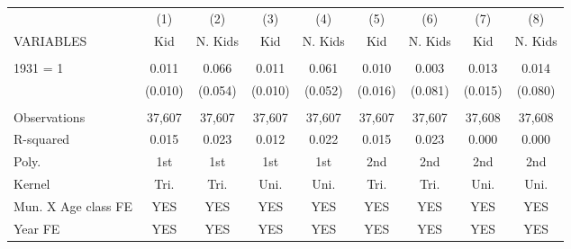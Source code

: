 \begin{tabular}{lcccccccc} \hline
 & (1) & (2) & (3) & (4) & (5) & (6) & (7) & (8) \\
VARIABLES & Kid & N. Kids & Kid & N. Kids & Kid & N. Kids & Kid & N. Kids \\ \hline
 &  &  &  &  &  &  &  &  \\
1931 = 1 & 0.011 & 0.066 & 0.011 & 0.061 & 0.010 & 0.003 & 0.013 & 0.014 \\
 & (0.010) & (0.054) & (0.010) & (0.052) & (0.016) & (0.081) & (0.015) & (0.080) \\
 &  &  &  &  &  &  &  &  \\
Observations & 37,607 & 37,607 & 37,607 & 37,607 & 37,607 & 37,607 & 37,608 & 37,608 \\
R-squared & 0.015 & 0.023 & 0.012 & 0.022 & 0.015 & 0.023 & 0.000 & 0.000 \\
Poly. & 1st & 1st & 1st & 1st & 2nd & 2nd & 2nd & 2nd \\
Kernel & Tri. & Tri. & Uni. & Uni. & Tri. & Tri. & Uni. & Uni. \\
Mun. X Age class FE & YES & YES & YES & YES & YES & YES & YES & YES \\
 Year FE & YES & YES & YES & YES & YES & YES & YES & YES \\ \hline
\end{tabular}
